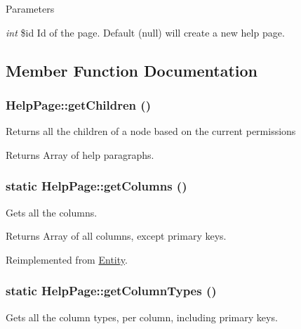 \begin{DoxyParams}{Parameters}
\item[{\em int}]\$id Id of the page. Default (null) will create a new help page. \end{DoxyParams}


\subsection{Member Function Documentation}
\hypertarget{classHelpPage_a8c3a55add9c738d8cda1d7cf197fcb87}{
\subsubsection[{getChildren}]{\setlength{\rightskip}{0pt plus 5cm}HelpPage::getChildren ()}}
\label{classHelpPage_a8c3a55add9c738d8cda1d7cf197fcb87}
Returns all the children of a node based on the current permissions

\begin{DoxyReturn}{Returns}
Array of help paragraphs. 
\end{DoxyReturn}
\hypertarget{classHelpPage_a56d2e02b9490b1834fadd39fdab3e312}{
\subsubsection[{getColumns}]{\setlength{\rightskip}{0pt plus 5cm}static HelpPage::getColumns ()}}
\label{classHelpPage_a56d2e02b9490b1834fadd39fdab3e312}
Gets all the columns.

\begin{DoxyReturn}{Returns}
Array of all columns, except primary keys. 
\end{DoxyReturn}


Reimplemented from \hyperlink{classEntity_a394717a08ffd54ec9a14d06727c86719}{Entity}.

\hypertarget{classHelpPage_abf83884baba4ef17e2d9f2510661f1dd}{
\subsubsection[{getColumnTypes}]{\setlength{\rightskip}{0pt plus 5cm}static HelpPage::getColumnTypes ()}}
\label{classHelpPage_abf83884baba4ef17e2d9f2510661f1dd}
Gets all the column types, per column, including primary keys.

